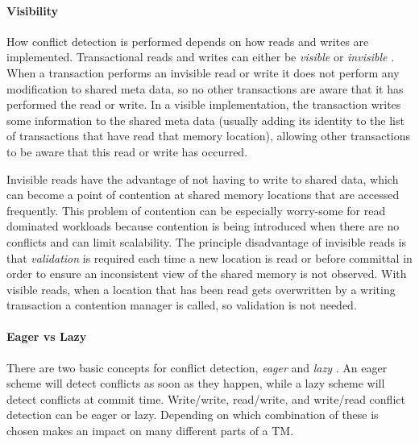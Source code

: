 \paragraph{Visibility}
How conflict detection is performed depends on how reads and writes are implemented.
Transactional reads and writes can either be \emph{visible} or \emph{invisible} \cite{IR09}.
When a transaction performs an invisible read or write it does not perform any 
modification to shared meta data, so no other transactions are aware that it has performed the read or write.
In a visible implementation, the transaction writes some 
information to the shared meta data (usually adding its identity to the list 
of transactions that have read that memory location), allowing other 
transactions to be aware that this read or write has occurred.

Invisible reads have the advantage of not having to write to shared data, 
which can become a point of contention at shared memory locations that are accessed frequently.
This problem of contention can be especially worry-some for read dominated 
workloads because contention is being introduced when there are no conflicts and can limit scalability.
The principle disadvantage of invisible reads is that  \emph{validation} is required
 each time a new location is read or before committal in order to ensure an inconsistent view of the shared memory is not observed.
With visible reads, when a location that has been read gets overwritten
 by a writing transaction a contention manager is called, so validation is not needed.


\paragraph{Eager vs Lazy}
There are two basic concepts for conflict detection, \emph{eager} and \emph{lazy} \cite{HLMS03}.
  An eager scheme will detect conflicts as soon as they happen, while a lazy scheme will detect conflicts at commit time.
Write/write, read/write, and write/read conflict detection can be eager or lazy.
  Depending on which combination of these is chosen makes an impact on many different parts of a TM.

